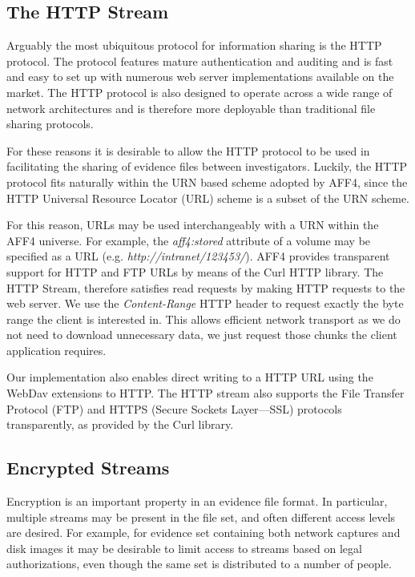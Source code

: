 \documentclass[10pt, conference]{IEEEtran}
\begin{document}
\subsection{The HTTP Stream}
Arguably the most ubiquitous protocol for information sharing is the
HTTP protocol\cite{HTTP_RFC}. The protocol features mature
authentication and auditing and is fast and easy to set up with
numerous web server implementations available on the market. The HTTP
protocol is also designed to operate across a wide range of network
architectures and is therefore more deployable than traditional file
sharing protocols.

For these reasons it is desirable to allow the HTTP protocol to be
used in facilitating the sharing of evidence files between
investigators. Luckily, the HTTP protocol fits naturally within the
URN based scheme adopted by AFF4, since the HTTP Universal Resource
Locator (URL) scheme is a subset of the URN scheme.

For this reason, URLs may be used interchangeably with a URN within
the AFF4 universe. For example, the \emph{aff4:stored} attribute of a
volume may be specified as a URL
(e.g. \emph{http://intranet/123453/}).  AFF4 provides transparent
support for HTTP and FTP URLs by means of the Curl HTTP
library\cite{libcurl}. The HTTP Stream, therefore satisfies read
requests by making HTTP requests to the web server. We use the
\emph{Content-Range} HTTP header to request exactly the byte range the
client is interested in. This allows efficient network transport as we
do not need to download unnecessary data, we just request those chunks
the client application requires.

Our implementation also enables direct writing to a HTTP URL using the
WebDav extensions to HTTP\cite{webdav-rfc}. The HTTP stream also
supports the File Transfer Protocol (FTP) and HTTPS (Secure Sockets
Layer---SSL) protocols transparently, as provided by the Curl library.

\subsection{Encrypted Streams}
\label{crypted_stream}
Encryption is an important property in an evidence file format. In
particular, multiple streams may be present in the file set, and often
different access levels are desired. For example, for evidence set
containing both network captures and disk images it may be desirable
to limit access to streams based on legal authorizations, even though
the same set is distributed to a number of people.
\end{document}
